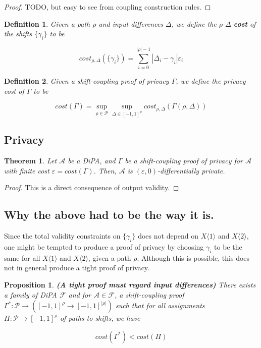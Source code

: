 \documentclass{article}
\newtheorem{theorem}{Theorem}
\newtheorem{proposition}{Proposition}[section]
\newtheorem{definition}{Definition}[section]
\renewcommand{\epsilon}{\varepsilon}
\newcommand{\1}{\langle 1 \rangle}
\newcommand{\2}{\langle 2 \rangle}
\begin{document}
\begin{proof}
    TODO, but easy to see from coupling construction rules.
\end{proof}

\begin{definition}
    Given a path $\rho$ and input differences $\Delta$, we define the $\rho$-$\Delta$-\textbf{cost} of the shifts $\{\gamma_i\}$ to be

    \[cost_{\rho, \Delta} (\{\gamma_i\}) = \sum_{i = 0}^{|\rho| - 1} |\Delta_i - \gamma_i| \epsilon_i\]
\end{definition}

\begin{definition}
    Given a shift-coupling proof of privacy $\Gamma$, we define the privacy cost of $\Gamma$ to be

    \[cost(\Gamma) = \sup_{\rho \in \mathcal{P}} \sup_{\Delta \in [-1, 1]^{\rho}} cost_{\rho, \Delta}(\Gamma(\rho, \Delta))\]
\end{definition}

\subsection{Privacy}

\begin{theorem}
    Let $\mathcal{A}$ be a DiPA, and $\Gamma$ be a shift-coupling proof of privacy for $\mathcal{A}$ with finite cost $\epsilon = cost(\Gamma)$. Then, $\mathcal{A}$ is $(\epsilon, 0)$-differentially private.
\end{theorem}

\begin{proof}
    This is a direct consequence of output validity. 
\end{proof}

\subsection{Why the above had to be the way it is.}

Since the total validity constraints on $\{\gamma_i\}$ does not depend on $X \1$ and $X \2$, one might be tempted to produce a proof of privacy by choosing $\gamma_i$ to be the same for all $X \1$ and $X \2$, given a path $\rho$. Although this is possible, this does not in general produce a tight proof of privacy.

\begin{proposition}
    \textbf{(A tight proof must regard input differences)} There exists a family of DiPA $\mathcal{F}$ and for $\mathcal{A} \in \mathcal{F}$, a shift-coupling proof $\Gamma^*: \mathcal{P} \to ([-1, 1]^{\rho} \to [-1, 1]^{|\rho|})$ such that for all assignments $\Pi: \mathcal{P} \to [-1, 1]^{\rho}$ of paths to shifts, we have 

    \[cost(\Gamma^*) < cost(\Pi)\]
\end{proposition}
\end{document}
